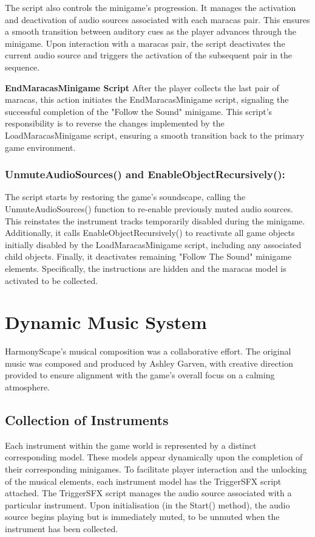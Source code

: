 \documentclass{l4proj}
\begin{document}
The script also controls the minigame's progression. It manages the activation and deactivation of audio sources associated with each maracas pair. This ensures a smooth transition between auditory cues as the player advances through the minigame. Upon interaction with a maracas pair, the script deactivates the current audio source and triggers the activation of the subsequent pair in the sequence.
\newline


\textbf{EndMaracasMinigame Script} \newline
After the player collects the last pair of maracas, this action initiates the EndMaracasMinigame script, signaling the successful completion of the "Follow the Sound" minigame. This script's responsibility is to reverse the changes implemented by the LoadMaracasMinigame script, ensuring a smooth transition back to the primary game environment.

\subsubsection{UnmuteAudioSources() and EnableObjectRecursively():} The script starts by restoring the game's soundscape, calling the UnmuteAudioSources() function to re-enable previously muted audio sources. This reinstates the instrument tracks temporarily disabled during the minigame. Additionally, it calls EnableObjectRecursively() to reactivate all game objects initially disabled by the LoadMaracasMinigame script, including any associated child objects. Finally, it deactivates remaining "Follow The Sound" minigame elements. Specifically, the instructions are hidden and the maracas model is activated to be collected.

\section{Dynamic Music System}
HarmonyScape's musical composition was a collaborative effort. The original music was composed and produced by Ashley Garven, with creative direction provided to ensure alignment with the game's overall focus on a calming atmosphere.

\subsection{Collection of Instruments}
Each instrument within the game world is represented by a distinct corresponding model. These models appear dynamically upon the completion of their corresponding minigames. To facilitate player interaction and the unlocking of the musical elements, each instrument model has the TriggerSFX script attached. The TriggerSFX script manages the audio source associated with a particular instrument. Upon initialisation (in the Start() method), the audio source begins playing but is immediately muted, to be unmuted when the instrument has been collected.
\end{document}
